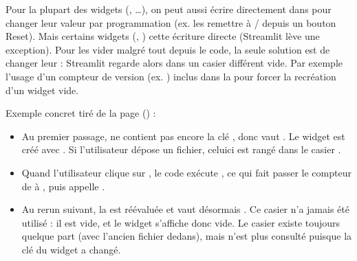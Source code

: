 \documentclass[letterpaper,10pt,english]{sphinxmanual}
\begin{document}
\sphinxAtStartPar
Pour la plupart des widgets (, …), on
peut aussi écrire directement dans  pour changer leur
valeur par programmation (ex. les remettre à / depuis un
bouton Reset). Mais certains widgets (, )  cette écriture directe (Streamlit
lève une exception). Pour les vider malgré tout depuis le code, la seule
solution est de changer leur  : Streamlit regarde alors dans un
casier différent vide. Par exemple l’usage d’un compteur
de version (ex. ) inclus dans la  pour forcer la
recréation d’un widget vide.

\sphinxAtStartPar
Exemple concret tiré de la page  () :
\begin{itemize}
\item {} 
\sphinxAtStartPar
Au premier passage,  ne contient pas encore la clé
, donc 
vaut . Le widget est créé avec . Si
l’utilisateur dépose un fichier, celui\sphinxhyphen{}ci est rangé dans le casier
.

\item {} 
\sphinxAtStartPar
Quand l’utilisateur clique sur , le code exécute
,
ce qui fait passer le compteur de  à , puis appelle .

\item {} 
\sphinxAtStartPar
Au rerun suivant, la  est réévaluée et vaut désormais
. Ce casier n’a jamais été utilisé : il est vide, et le
widget s’affiche donc vide. Le casier  existe toujours
quelque part (avec l’ancien fichier dedans), mais n’est plus consulté
puisque la clé du widget a changé.

\end{itemize}
\end{document}
